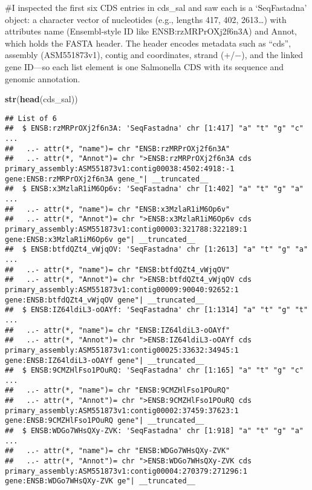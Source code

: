 \documentclass[
]{article}
\newenvironment{Shaded}{\begin{snugshade}}{\end{snugshade}}
\newcommand{\FunctionTok}[1]{\textcolor[rgb]{0.13,0.29,0.53}{\textbf{#1}}}
\newcommand{\NormalTok}[1]{#1}
\begin{document}
\#I inspected the first six CDS entries in cds\_sal and saw each is a
`SeqFastadna' object: a character vector of nucleotides (e.g., lengths
417, 402, 2613\ldots) with attributes name (Ensembl-style ID like
ENSB:rzMRPrOXj2f6n3A) and Annot, which holds the FASTA header. The
header encodes metadata such as ``cds'', assembly (ASM551873v1), contig
and coordinates, strand (+/−), and the linked gene ID---so each list
element is one Salmonella CDS with its sequence and genomic annotation.

\begin{Shaded}
\begin{Highlighting}[]
\FunctionTok{str}\NormalTok{(}\FunctionTok{head}\NormalTok{(cds\_sal))}
\end{Highlighting}
\end{Shaded}

\begin{verbatim}
## List of 6
##  $ ENSB:rzMRPrOXj2f6n3A: 'SeqFastadna' chr [1:417] "a" "t" "g" "c" ...
##   ..- attr(*, "name")= chr "ENSB:rzMRPrOXj2f6n3A"
##   ..- attr(*, "Annot")= chr ">ENSB:rzMRPrOXj2f6n3A cds primary_assembly:ASM551873v1:contig00038:4502:4918:-1 gene:ENSB:rzMRPrOXj2f6n3A gene_"| __truncated__
##  $ ENSB:x3MzlaR1iM6Op6v: 'SeqFastadna' chr [1:402] "a" "t" "g" "a" ...
##   ..- attr(*, "name")= chr "ENSB:x3MzlaR1iM6Op6v"
##   ..- attr(*, "Annot")= chr ">ENSB:x3MzlaR1iM6Op6v cds primary_assembly:ASM551873v1:contig00003:321788:322189:1 gene:ENSB:x3MzlaR1iM6Op6v ge"| __truncated__
##  $ ENSB:btfdQZt4_vWjqOV: 'SeqFastadna' chr [1:2613] "a" "t" "g" "a" ...
##   ..- attr(*, "name")= chr "ENSB:btfdQZt4_vWjqOV"
##   ..- attr(*, "Annot")= chr ">ENSB:btfdQZt4_vWjqOV cds primary_assembly:ASM551873v1:contig00009:90040:92652:1 gene:ENSB:btfdQZt4_vWjqOV gene"| __truncated__
##  $ ENSB:IZ64ldiL3-oOAYf: 'SeqFastadna' chr [1:1314] "a" "t" "g" "t" ...
##   ..- attr(*, "name")= chr "ENSB:IZ64ldiL3-oOAYf"
##   ..- attr(*, "Annot")= chr ">ENSB:IZ64ldiL3-oOAYf cds primary_assembly:ASM551873v1:contig00025:33632:34945:1 gene:ENSB:IZ64ldiL3-oOAYf gene"| __truncated__
##  $ ENSB:9CMZHlFso1POuRQ: 'SeqFastadna' chr [1:165] "a" "t" "g" "c" ...
##   ..- attr(*, "name")= chr "ENSB:9CMZHlFso1POuRQ"
##   ..- attr(*, "Annot")= chr ">ENSB:9CMZHlFso1POuRQ cds primary_assembly:ASM551873v1:contig00002:37459:37623:1 gene:ENSB:9CMZHlFso1POuRQ gene"| __truncated__
##  $ ENSB:WDGo7WHsQXy-ZVK: 'SeqFastadna' chr [1:918] "a" "t" "g" "a" ...
##   ..- attr(*, "name")= chr "ENSB:WDGo7WHsQXy-ZVK"
##   ..- attr(*, "Annot")= chr ">ENSB:WDGo7WHsQXy-ZVK cds primary_assembly:ASM551873v1:contig00004:270379:271296:1 gene:ENSB:WDGo7WHsQXy-ZVK ge"| __truncated__
\end{verbatim}
\end{document}

